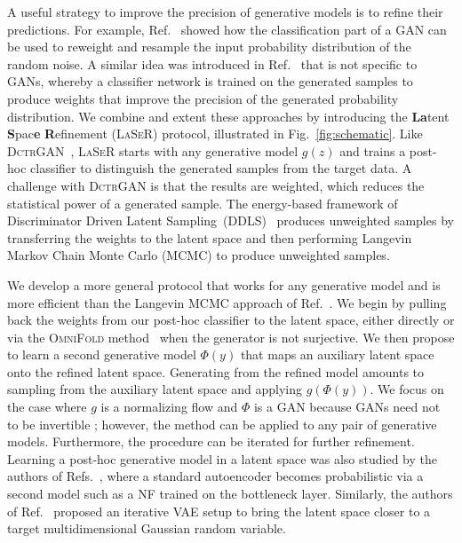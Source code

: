 A useful strategy to improve the precision of generative models is to refine their predictions. For example, Ref.~\cite{che2020gan} showed how the classification part of a GAN can be used to reweight and resample the input probability distribution of the random noise. A similar idea was introduced in Ref.~\cite{2009.03796} that is not specific to GANs, whereby a classifier network is trained on the generated samples to produce weights that improve the precision of the generated probability distribution. We combine and extent these approaches by introducing the \textbf{La}tent \textbf{S}pac\textbf{e} \textbf{R}efinement (\textsc{LaSeR}) protocol, illustrated in Fig.~\ref{fig:schematic}. Like \textsc{DctrGAN}~\cite{2009.03796,Andreassen:2019nnm}, \textsc{LaSeR} starts with any generative model $g(z)$ and trains a post-hoc classifier to distinguish the generated samples from the target data. A challenge with \textsc{DctrGAN} is that the results are weighted, which reduces the statistical power of a generated sample. The energy-based framework of Discriminator Driven Latent Sampling~(DDLS)~\cite{che2020gan} produces unweighted samples by transferring the weights to the latent space and then performing Langevin Markov Chain Monte Carlo (MCMC) to produce unweighted samples.  

We develop a more general protocol that works for any generative model and is more efficient than the Langevin MCMC approach of Ref.~\cite{che2020gan}. We begin by pulling back the weights from our post-hoc classifier to the latent space, either directly or via the \textsc{OmniFold} method~\cite{Andreassen:2019cjw} when the generator is not surjective. We then propose to learn a second generative model $\Phi(y)$ that maps an auxiliary latent space onto the refined latent space. Generating from the refined model amounts to sampling from the auxiliary latent space and applying $g(\Phi(y))$. We focus on the case where $g$ is a normalizing flow and $\Phi$ is a GAN because GANs need not to be invertible
; however, the method can be applied to any pair of generative models. Furthermore, the procedure can be iterated for further refinement.  Learning a post-hoc generative model in a latent space was also studied by the authors of Refs.~\cite{bohm2020probabilistic,pmlr-v37-li15,xiao2019generative}, where a standard autoencoder becomes probabilistic via a second model such as a NF trained on the bottleneck layer. Similarly, the authors of Ref.~\cite{dai2018diagnosing} proposed an iterative VAE setup to bring the latent space closer to a target multidimensional Gaussian random variable.

